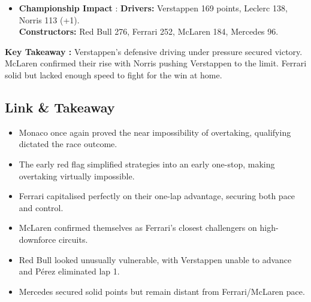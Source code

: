 \begin{itemize}
    \item \textbf{Championship Impact} : \textbf{Drivers:} Verstappen 169 points, Leclerc 138, Norris 113 (+1).\\
    \textbf{Constructors:} Red Bull 276, Ferrari 252, McLaren 184, Mercedes 96.    
\end{itemize}

\textbf{Key Takeaway :}
Verstappen’s defensive driving under pressure secured victory. McLaren confirmed their rise with Norris pushing Verstappen to the limit. Ferrari solid but lacked enough speed to fight for the win at home.


\subsection{Link \& Takeaway}

\begin{itemize}
    \item Monaco once again proved the near impossibility of overtaking, qualifying dictated the race outcome. 
    \item The early red flag simplified strategies into an early one-stop, making overtaking virtually impossible.
    \item Ferrari capitalised perfectly on their one-lap advantage, securing both pace and control. 
    \item McLaren confirmed themselves as Ferrari’s closest challengers on high-downforce circuits. 
    \item Red Bull looked unusually vulnerable, with Verstappen unable to advance and Pérez eliminated lap 1. 
    \item Mercedes secured solid points but remain distant from Ferrari/McLaren pace. 
\end{itemize}